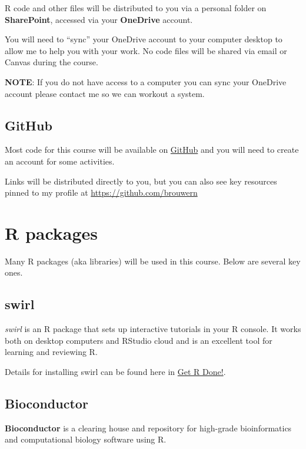 \documentclass[
]{book}
\begin{document}
R code and other files will be distributed to you via a personal folder on \textbf{SharePoint}, accessed via your \textbf{OneDrive} account.

You will need to ``sync'' your OneDrive account to your computer desktop to allow me to help you with your work. No code files will be shared via email or Canvas during the course.

\textbf{NOTE}: If you do not have access to a computer you can sync your OneDrive account please contact me so we can workout a system.

\hypertarget{github}{%
\subsection{GitHub}\label{github}}

Most code for this course will be available on \href{https://github.com/}{GitHub} and you will need to create an account for some activities.

Links will be distributed directly to you, but you can also see key resources pinned to my profile at \url{https://github.com/brouwern}

\hypertarget{r-packages}{%
\section{R packages}\label{r-packages}}

Many R packages (aka libraries) will be used in this course. Below are several key ones.

\hypertarget{swirl}{%
\subsection{swirl}\label{swirl}}

\emph{swirl} is an R package that sets up interactive tutorials in your R console. It works both on desktop computers and RStudio cloud and is an excellent tool for learning and reviewing R.

Details for installing swirl can be found here in \href{https://brouwern.github.io/getRdone/swirl.html\#swirl}{Get R Done!}.

\hypertarget{bioconductor}{%
\subsection{Bioconductor}\label{bioconductor}}

\textbf{Bioconductor} is a clearing house and repository for high-grade bioinformatics and computational biology software using R.
\end{document}
